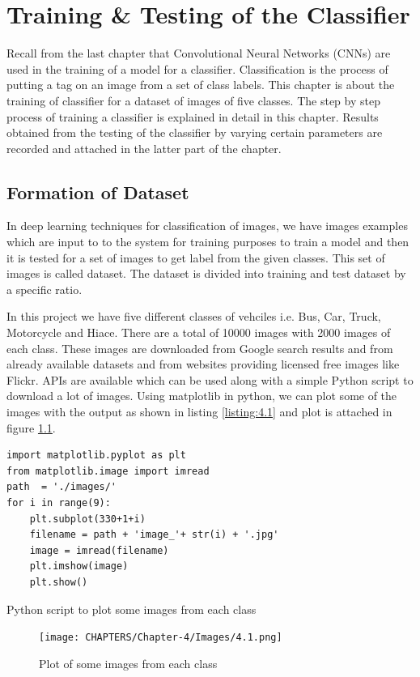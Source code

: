 \chapter{Training \& Testing of the
Classifier}
\label{Chapter 4}
Recall from the last chapter that Convolutional Neural Networks (CNNs) are used
in the training of a model for a classifier. Classification is the process
of putting a tag on an image from a set of class labels. This chapter is about the
training of classifier for a dataset of images of five classes.
The step by step process of training a classifier is explained in detail in this chapter. Results obtained from the testing of the classifier by varying certain parameters are recorded and attached
in the latter part of the chapter.
\section{Formation of Dataset}
In deep learning techniques for classification of images, we have
images examples which are input to to the system for training purposes
to train a model and then it is tested for a set of images to get
label from the given classes. This set of images is called dataset.
The dataset is divided into training and test dataset by a specific ratio.

In this project we have five different classes of vehciles i.e. Bus, Car, Truck, Motorcycle
and Hiace. There are a total of 10000 images with 2000 images of each 
class. These images are downloaded from Google search results and from already available
datasets and from websites providing licensed free images like Flickr. APIs are available which
can be used along with a simple Python script to download a lot of images.
Using matplotlib in python, we can plot some of the images with the output as
shown in listing \ref{listing:4.1} and plot is attached in figure
\ref{fig:4.1}.
\linespread{1.0}
\begin{listing}[H]
\begin{verbatim}
import matplotlib.pyplot as plt
from matplotlib.image import imread  
path  = './images/'
for i in range(9):
    plt.subplot(330+1+i)
    filename = path + 'image_'+ str(i) + '.jpg'
    image = imread(filename)
    plt.imshow(image)    
    plt.show()
\end{verbatim}
\caption{Python script to plot some images from each class}
\label{listing:4.1}
\end{listing}

\begin{figure}[H]
    \centering
    \captionsetup{justification = centering}
    \texttt{[image: CHAPTERS/Chapter-4/Images/4.1.png]}
    \caption{Plot of some images from each class} 
    \label{fig:4.1}
  \end{figure}

